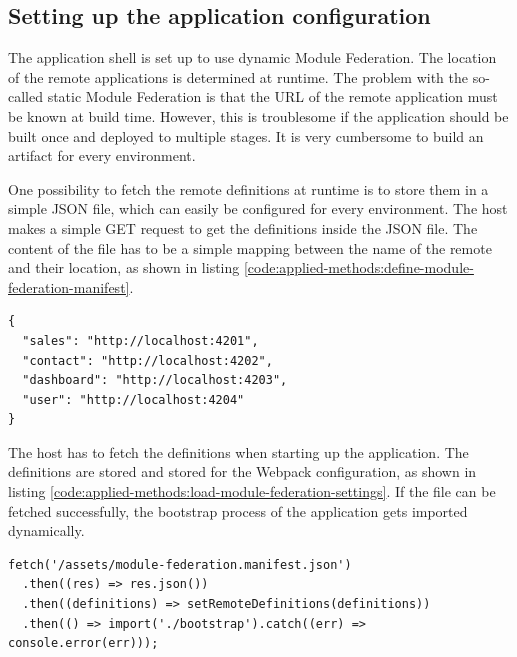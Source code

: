 \subsection{Setting up the application configuration}\label{subsection:applied-methods:prototypical-implementation
:load-remote-settings}

The application shell is set up to use dynamic Module Federation. The location of the remote applications is determined at runtime. The problem with the so-called static Module Federation is that the \ac{URL} of the remote application must be known at build time. However, this is troublesome if the application should be built once and deployed to multiple stages. It is very cumbersome to build an artifact for every environment.

\bigskip

\noindent One possibility to fetch the remote definitions at runtime is to store them in a simple \ac{JSON} file, which can easily be configured for every environment. The host makes a simple GET request to get the definitions inside the \ac{JSON} file. The content of the file has to be a simple mapping between the name of the remote and their location, as shown in listing \ref{code:applied-methods:define-module-federation-manifest}.

\ifshowListings
\begin{listing}[H]
\begin{verbatim}
{
  "sales": "http://localhost:4201",
  "contact": "http://localhost:4202",
  "dashboard": "http://localhost:4203",
  "user": "http://localhost:4204"
}
\end{verbatim}
\caption{Loading micro-frontend \acp{URL} during startup.}\label{code:applied-methods:define-module-federation-manifest}
\end{listing}
\fi

\noindent The host has to fetch the definitions when starting up the application. The definitions are stored and stored for the Webpack configuration, as shown in listing \ref{code:applied-methods:load-module-federation-settings}. If the file can be fetched successfully, the bootstrap process of the application gets imported dynamically.

\ifshowListings
\begin{listing}[H]
\begin{verbatim}
fetch('/assets/module-federation.manifest.json')
  .then((res) => res.json())
  .then((definitions) => setRemoteDefinitions(definitions))
  .then(() => import('./bootstrap').catch((err) => console.error(err)));
\end{verbatim}
\caption{Loading micro-frontend \acp{URL} during initialization.}\label{code:applied-methods:load-module-federation-settings}
\end{listing}
\fi

